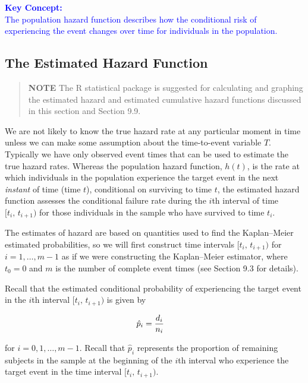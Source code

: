 \documentclass[
]{book}
\begin{document}
\textbf{\textcolor{blue}{Key Concept:}}\\
\textcolor{blue}{The population hazard function describes how the conditional risk of experiencing the event changes over time for individuals in the population.}

\hypertarget{the-estimated-hazard-function}{%
\subsection*{The Estimated Hazard Function}\label{the-estimated-hazard-function}}

\begin{quote}
\textbf{NOTE} The R statistical package is suggested for calculating and graphing the estimated hazard and estimated cumulative hazard functions discussed in this section and Section 9.9.
\end{quote}

We are not likely to know the true hazard rate at any particular moment in time unless we can make some assumption about the time-to-event variable \(T\). Typically we have only observed event times that can be used to estimate the true hazard rates. Whereas the population hazard function, \(h(t)\), is the rate at which individuals in the population experience the target event in the next \emph{instant} of time (time \(t\)), conditional on surviving to time \(t\), the estimated hazard function assesses the conditional failure rate during the \(i\)th interval of time \([t_i,\,t_{i+1})\) for those individuals in the sample who have survived to time \(t_i\).

The estimates of hazard are based on quantities used to find the Kaplan--Meier estimated probabilities, so we will first construct time intervals \([t_i,\,t_{i+1})\) for \(i = 1,\dots,m-1\) as if we were constructing the Kaplan--Meier estimator, where \(t_0 = 0\) and \(m\) is the number of complete event times (see Section 9.3 for details).

Recall that the estimated conditional probability of experiencing the target event in the \(i\)th interval \([t_i,\,t_{i+1})\) is given by

\begin{align}
\hat p_i &= \frac{d_i}{n_i}
\notag
\end{align}

for \(i=0,1,\dots,m-1\). Recall that \(\hat p_i\) represents the proportion of remaining subjects in the sample at the beginning of the \(i\)th interval who experience the target event in the time interval \([t_i,\,t_{i+1})\).
\end{document}
